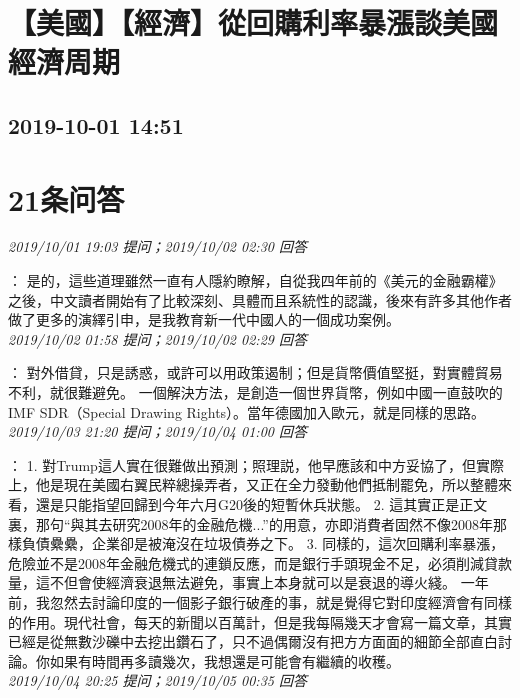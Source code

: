 \documentclass[twocolumn]{ctexart}
\begin{document}
\section{【美國】【經濟】從回購利率暴漲談美國經濟周期}
\subsection{2019-10-01 14:51}


\section{21条问答}

\textit{\hfill\noindent\small 2019/10/01 19:03 提问；2019/10/02 02:30 回答}

：
是的，這些道理雖然一直有人隱約瞭解，自從我四年前的《美元的金融霸權》之後，中文讀者開始有了比較深刻、具體而且系統性的認識，後來有許多其他作者做了更多的演繹引申，是我教育新一代中國人的一個成功案例。
\\

\textit{\hfill\noindent\small 2019/10/02 01:58 提问；2019/10/02 02:29 回答}

：
對外借貸，只是誘惑，或許可以用政策遏制；但是貨幣價值堅挺，對實體貿易不利，就很難避免。
一個解決方法，是創造一個世界貨幣，例如中國一直鼓吹的IMF SDR（Special Drawing Rights）。當年德國加入歐元，就是同樣的思路。
\\

\textit{\hfill\noindent\small 2019/10/03 21:20 提问；2019/10/04 01:00 回答}

：
1. 對Trump這人實在很難做出預測；照理説，他早應該和中方妥協了，但實際上，他是現在美國右翼民粹總操弄者，又正在全力發動他們抵制罷免，所以整體來看，還是只能指望回歸到今年六月G20後的短暫休兵狀態。 
2. 這其實正是正文裏，那句“與其去研究2008年的金融危機...”的用意，亦即消費者固然不像2008年那樣負債纍纍，企業卻是被淹沒在垃圾債券之下。 
3. 同樣的，這次回購利率暴漲，危險並不是2008年金融危機式的連鎖反應，而是銀行手頭現金不足，必須削減貸款量，這不但會使經濟衰退無法避免，事實上本身就可以是衰退的導火綫。 
一年前，我忽然去討論印度的一個影子銀行破產的事，就是覺得它對印度經濟會有同樣的作用。現代社會，每天的新聞以百萬計，但是我每隔幾天才會寫一篇文章，其實已經是從無數沙礫中去挖出鑽石了，只不過偶爾沒有把方方面面的細節全部直白討論。你如果有時間再多讀幾次，我想還是可能會有繼續的收穫。
\\

\textit{\hfill\noindent\small 2019/10/04 20:25 提问；2019/10/05 00:35 回答}
\end{document}
